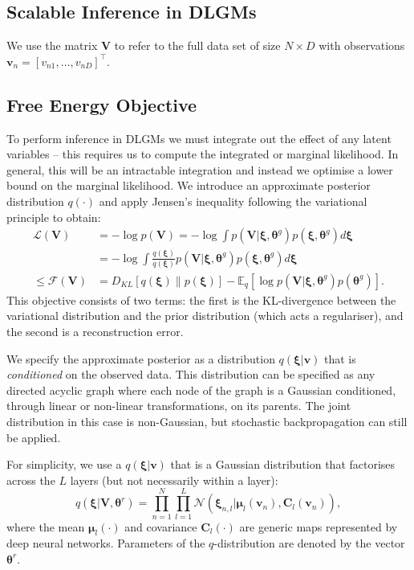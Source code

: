 \documentclass{article}
\newcommand{\FE}{\mathcal{F}} %
\newcommand{\vis}{\ensuremath{\mathbf{v}}} %
\newcommand{\N}{\mathcal{N}} %
\newcommand{\expect}[2]{\mathbb{E}_{#1}\left[#2\right]}
\newcommand{\myvec}[1]{\mbox{$\mathbf{#1}$}}
\newcommand{\myvecsym}[1]{\mbox{$\boldsymbol{#1}$}}
\newcommand{\vmu}{\mbox{$\myvecsym{\mu}$}}
\newcommand{\vtheta}{\mbox{$\myvecsym{\theta}$}}
\newcommand{\vxi}{\mbox{$\myvecsym{\xi}$}}
\newcommand{\vv}{\mbox{$\myvec{v}$}}
\newcommand{\vC}{\mbox{$\myvec{C}$}}
\newcommand{\vV}{\mbox{$\myvec{V}$}}
\begin{document}
\begin{bibunit}[icml2013]
\section{Scalable Inference in DLGMs}
\label{sec:learning}
We use the matrix $\vV$ to refer to the full data set of size 
$N\times D$ with observations $\vv_n = [v_{n1}, \ldots, v_{nD}]^\top$. 

\vspace{-2mm}
\subsection{Free Energy Objective}
To perform inference in DLGMs we must integrate out the effect of 
any latent variables -- this requires us to compute the integrated or marginal 
likelihood. 
In general, this will be an intractable integration and instead we optimise a 
lower bound on the marginal likelihood. We introduce an 
approximate posterior distribution $q(\cdot)$ and apply Jensen's inequality 
following the variational principle \citep{beal2003} to obtain:
\vspace{-3mm}
\begin{align}
\mathcal{L}(\vV) &= -\log p(\vV) = -\log \int p(\vV |\vxi,\vtheta^g) 
p(\vxi,\vtheta^g)  d\vxi \nonumber \\
& = -\log \int  \frac{ q(\vxi)}{q(\vxi) } p(\vV |\vxi,\vtheta^g) 
p(\vxi,\vtheta^g)
 d\vxi  \label{eq:FE} \\ 
{\leq} \FE(\vV) & \!=\!D_{KL}[q(\vxi) \| p(\vxi)]\! -\! \expect{q}{\log p(\vV 
|\vxi,\!\vtheta^g)p(\vtheta^g)} .\nonumber
\end{align}
This objective consists of two terms: the first 
is the KL-divergence between the variational distribution and the prior 
distribution (which acts a regulariser), and the second is a reconstruction 
error. 

We specify the approximate posterior as  a distribution $q(\vxi | \vv)$ that is \textit{conditioned} on the observed data. This distribution can be specified as any directed acyclic graph where each node of the graph is a Gaussian conditioned, through linear or non-linear transformations, on its parents. The joint distribution in this case is non-Gaussian, but stochastic backpropagation can still be applied.  

For simplicity, we use a $q(\vxi | \vv)$ that is a Gaussian distribution that factorises across 
the $L$ layers (but not necessarily within a layer):
\vspace{-2mm}
\begin{equation}
q(\vxi | \vV, \vtheta^r) = \prod_{n=1}^N \prod_{l=1}^L  \N\left( 
\vxi_{n,l} | 
\vmu_{l}(\vis_n), \vC_l(\vis_n)  \right),
\label{eq:Q}
\end{equation}
where the mean $\vmu_l(\cdot)$ and covariance $\vC_l(\cdot)$ are generic maps represented by 
deep neural networks. Parameters of the $q$-distribution are denoted by the vector $\vtheta^r$.


\end{bibunit}
\end{document}

